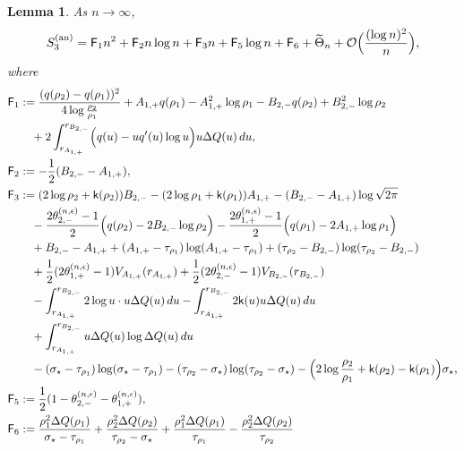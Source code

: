 \documentclass[a4paper]{article}
\newtheorem{lemma}[theorem]{Lemma}
\numberwithin{equation}{section}
\begin{document}
\begin{lemma}\label{lemma:S3 theta function part}
As $n\to\infty$,
\begin{align}
\label{def of expansion S3 part annulus}
    S_3^{(\mathrm{an})}=\mathsf{F}_1n^2
    +\mathsf{F}_2n\log n 
    +\mathsf{F}_3n
    +\mathsf{F}_5\log n 
    +\mathsf{F}_6
    +\widetilde{\Theta}_{n}+\mathcal{O}\Bigl(\frac{(\log n)^2}{n}\Bigr),
\end{align}
where 
\begin{align*}
\mathsf{F}_1&:=
\frac{(q(\rho_2)-q(\rho_1))^2}{4\log\frac{\rho_2}{\rho_1}}+A_{1,+}q(\rho_1)-A_{1,+}^2\log\rho_1-B_{2,-}q(\rho_2)+B_{2,-}^2\log\rho_2
\\
&\quad
+2\int_{r_{A_{1,+}}}^{r_{B_{2,-}}}\Bigl( 
q(u)-uq'(u)\log u
\Bigr)u\Delta Q(u)\,du, 
\\
\mathsf{F}_2&:=
-\frac{1}{2}(B_{2,-}-A_{1,+}),
\\
\mathsf{F}_3&:=
(2\log \rho_2+\mathsf{k}(\rho_2))B_{2,-}-(2\log \rho_1+\mathsf{k}(\rho_1))A_{1,+}
-(B_{2,-}-A_{1,+})\log\sqrt{2\pi}
\\
&\quad
-\frac{2\theta_{2,-}^{(n,\epsilon)}-1}{2}\Bigl(q(\rho_2)-2B_{2,-}\log\rho_2\Bigr)
-\frac{2\theta_{1,+}^{(n,\epsilon)}-1}{2}\Bigl( q(\rho_1)-2A_{1,+}\log\rho_1\Bigr)
\\
&\quad+
B_{2,-}-A_{1,+}
+(A_{1,+}-\tau_{\rho_1})\log (A_{1,+}-\tau_{\rho_1})
+(\tau_{\rho_2}-B_{2,-})\log (\tau_{\rho_2}-B_{2,-})
\\
&\quad
+\frac{1}{2}(2\theta_{1,+}^{(n,\epsilon)}-1)V_{A_{1,+}}(r_{A_{1,+}})
+\frac{1}{2}(2\theta_{2,-}^{(n,\epsilon)}-1)V_{B_{2,-}}(r_{B_{2,-}})
\\
&\quad
-\int_{r_{A_{1,+}}}^{r_{B_{2,-}}}2\log u\cdot u\Delta Q(u)\,du
-\int_{r_{A_{1,+}}}^{r_{B_{2,-}}}2\mathsf{k}(u)u\Delta Q(u)\,du
\\
&\quad
+\int_{r_{A_{1,+}}}^{r_{B_{2,-}}}u\Delta Q(u)\log \Delta Q(u)\,du
\\
&\quad -(\sigma_{\star}
-\tau_{\rho_1})\log (\sigma_{\star}-\tau_{\rho_1})
-(\tau_{\rho_2}-\sigma_{\star})\log (\tau_{\rho_2}-\sigma_{\star})
-\Bigl(2\log \frac{\rho_2}{\rho_1}+\mathsf{k}(\rho_2)-\mathsf{k}(\rho_1)\Bigr)\sigma_{\star}, 
\\
    \mathsf{F}_5&:=
\frac{1}{2}(1-\theta_{2,-}^{(n,\epsilon)}-\theta_{1,+}^{(n,\epsilon)}),
\\
\mathsf{F}_6&:= 
 \frac{\rho_1^2\Delta Q(\rho_1)}{\sigma_{\star}-\tau_{\rho_1}}
+\frac{\rho_2^2\Delta Q(\rho_2)}{\tau_{\rho_2}-\sigma_{\star}}
+\frac{\rho_1^2\Delta Q(\rho_1)}{\tau_{\rho_1}}
-\frac{\rho_2^2\Delta Q(\rho_2)}{\tau_{\rho_2}}

\end{align*}
\end{lemma}
\end{document}
